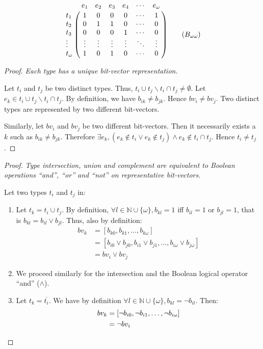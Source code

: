 \documentclass[format=sigconf]{acmart}
\theoremstyle{definition}
\begin{document}
\[
  \bordermatrix{
            &e_1   &e_2   &e_3    &e_4    &\cdots&e_\omega \cr
    t_1     &1     &0     &0      &0     &\cdots&1       \cr
    t_2     &0     &1     &1      &0     &\cdots&0       \cr
    t_3     &0     &0     &0      &1     &\cdots&0       \cr
    \vdots  &\vdots&\vdots&\vdots&\vdots&\ddots&\vdots  \cr
    t_\omega&1     &0     &1      &0     &\cdots&0
  } \label{eq:matrix} \tag{$B_{\omega\omega}$}
\]

\begin{proof}
  \emph{\small Each type has a unique bit-vector representation.}
  \newcommand{\reldiff}[2]{#1 \cup #2 \backslash #1 \cap #2}

  Let $t_i$ and $t_j$ be two distinct types. Thus, $\reldiff{t_i}{t_j} \neq \emptyset$.
  Let $e_k \in \reldiff{t_i}{t_j}$. By definition, we have $b_{ik} \neq b_{jk}$.
  Hence $bv_i \neq bv_j$. Two distinct types are represented by two different
  bit-vectors.

  Similarly, let $bv_i$ and $bv_j$ be two different bit-vectors. Then it
  necessarily exists a $k$ such as $b_{ik} \neq b_{jk}$. Therefore
  $\exists e_k, \left(e_k \notin t_i \vee e_k \notin t_j\right) \wedge e_k
  \notin t_i \cap t_j$. Hence $t_i \neq t_j$. \qedhere
\end{proof}

\begin{proof}
  \emph{\small Type intersection, union and complement are equivalent to Boolean
    operations ``and'', ``or'' and ``not'' on representative bit-vectors.}

  Let two types $t_i$ and $t_j$ in:
  \begin{enumerate}
  \item Let $t_k = t_i \cup t_j$. By definition, $\forall l \in \mathbb{N} \cup
    \{\omega\}, b_{kl} = 1$ iff $b_{il} = 1$ or $b_{jl} = 1$, that is $b_{kl} =
    b_{il} \vee b_{jl}$. Thus, also by definition:
    \begin{align*}
      bv_k &= \left[b_{k0}, b_{k1}, \dots, b_{k\omega}\right]  \\
           &= \left[b_{i0} \vee b_{j0}, b_{i1} \vee b_{j1}, \dots, b_{i\omega} \vee b_{j\omega}\right]  \\
           &= bv_i \vee bv_j
    \end{align*}
  \item We proceed similarly for the intersection and the Boolean logical operator
    ``and'' ($\wedge$).
  \item Let $t_k = \overline{t_i}$. We have by definition $\forall l \in
    \mathbb{N} \cup \{\omega\}, b_{kl} = \neg b_{il}$. Then:
    \begin{align*}
      bv_k &= \left[\neg b_{i0}, \neg b_{i1}, \dots, \neg b_{i\omega}\right]  \\
           &= \neg bv_i \qedhere
    \end{align*}
  \end{enumerate}
\end{proof}
\end{document}
